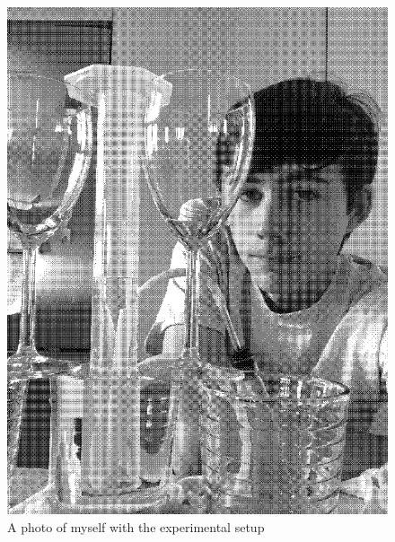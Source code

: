 \documentclass[12pt]{article}
\begin{document}
	\begin{figure}[H]
		\centerline{\includegraphics[width=.5\textwidth]{images/selfie.EPS}}
		\caption{A photo of myself with the experimental setup}
	\end{figure}
\end{document}

